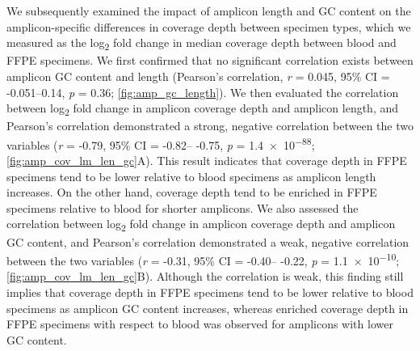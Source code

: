 We subsequently examined the impact of amplicon length and GC content on the amplicon-specific differences in coverage depth between specimen types, which we measured as the log\textsubscript{2} fold change in median coverage depth between blood and FFPE specimens. We first confirmed that no significant correlation exists between amplicon GC content and length (Pearson's correlation, \textit{r} = 0.045, 95\% CI = -0.051--0.14, \textit{p} = 0.36; \autoref{fig:amp_gc_length}). We then evaluated the correlation between log\textsubscript{2} fold change in amplicon coverage depth and amplicon length, and Pearson's correlation demonstrated a strong, negative correlation between the two variables (\textit{r} = -0.79, 95\% CI = -0.82-- -0.75, \textit{p} = \num{1.4e-88}; \autoref{fig:amp_cov_lm_len_gc}A). This result indicates that coverage depth in FFPE specimens tend to be lower relative to blood specimens as amplicon length increases. On the other hand, coverage depth tend to be enriched in FFPE specimens relative to blood for shorter amplicons. We also assessed the correlation between log\textsubscript{2} fold change in amplicon coverage depth and amplicon GC content, and Pearson's correlation demonstrated a weak, negative correlation between the two variables (\textit{r} = -0.31, 95\% CI = -0.40-- -0.22, \textit{p} = \num{1.1e-10}; \autoref{fig:amp_cov_lm_len_gc}B). Although the correlation is weak, this finding still implies that coverage depth in FFPE specimens tend to be lower relative to blood specimens as amplicon GC content increases, whereas enriched coverage depth in FFPE specimens with respect to blood was observed for amplicons with lower GC content.

